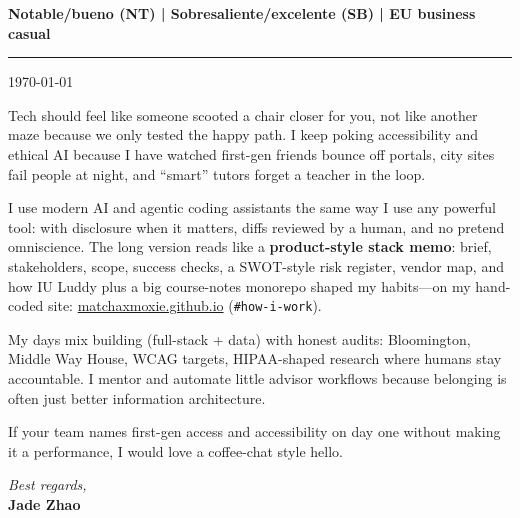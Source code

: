 \documentclass[11pt]{article}
\begin{document}

\vspace{0.25em}\newline\noindent\textbf{Notable/bueno (NT) \;|\; Sobresaliente/excelente (SB) \;|\; EU business casual}\n

\vspace{0.5em}
\noindent\rule{\linewidth}{1pt}
\vspace{0.75em}

\noindent\today

\vspace{0.75em}

Tech should feel like someone scooted a chair closer for you, not like another maze because we only tested the happy path. I keep poking accessibility and ethical AI because I have watched first-gen friends bounce off portals, city sites fail people at night, and ``smart'' tutors forget a teacher in the loop.

I use modern AI and agentic coding assistants the same way I use any powerful tool: with disclosure when it matters, diffs reviewed by a human, and no pretend omniscience. The long version reads like a \textbf{product-style stack memo}: brief, stakeholders, scope, success checks, a SWOT-style risk register, vendor map, and how IU Luddy plus a big course-notes monorepo shaped my habits---on my hand-coded site: \href{https://matchaxmoxie.github.io/matchaxmoxie/\#how-i-work}{matchaxmoxie.github.io} (\texttt{\#how-i-work}).

My days mix building (full-stack + data) with honest audits: Bloomington, Middle Way House, WCAG targets, HIPAA-shaped research where humans stay accountable. I mentor and automate little advisor workflows because belonging is often just better information architecture.

If your team names first-gen access and accessibility on day one without making it a performance, I would love a coffee-chat style hello.

\vspace{1.5em}
\noindent\textit{Best regards,}\\
\textbf{Jade Zhao}
\end{document}
